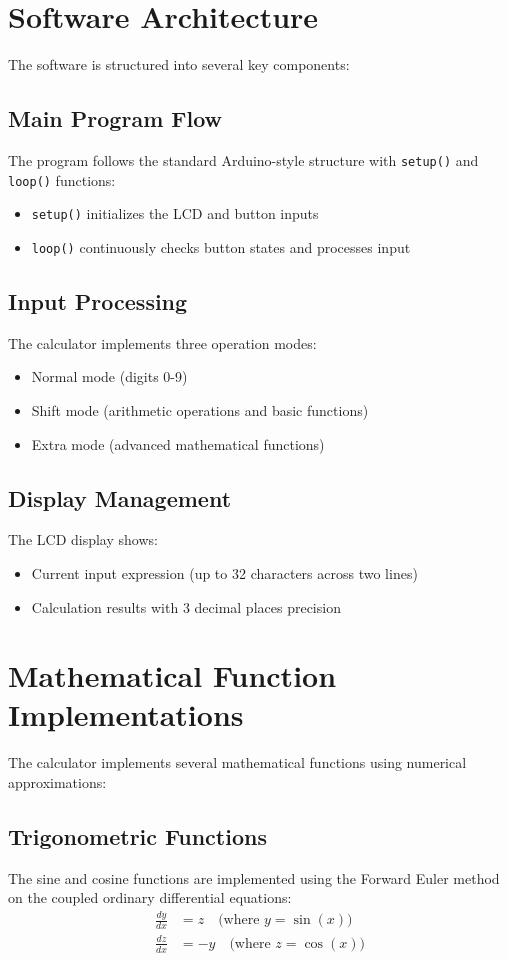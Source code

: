 \documentclass{article}
\begin{document}
\section{Software Architecture}
The software is structured into several key components:

\subsection{Main Program Flow}
The program follows the standard Arduino-style structure with \texttt{setup()} and \texttt{loop()} functions:
\begin{itemize}
    \item \texttt{setup()} initializes the LCD and button inputs
    \item \texttt{loop()} continuously checks button states and processes input
\end{itemize}

\subsection{Input Processing}
The calculator implements three operation modes:
\begin{itemize}
    \item Normal mode (digits 0-9)
    \item Shift mode (arithmetic operations and basic functions)
    \item Extra mode (advanced mathematical functions)
\end{itemize}

\subsection{Display Management}
The LCD display shows:
\begin{itemize}
    \item Current input expression (up to 32 characters across two lines)
    \item Calculation results with 3 decimal places precision
\end{itemize}

\section{Mathematical Function Implementations}
The calculator implements several mathematical functions using numerical approximations:

\subsection{Trigonometric Functions}
The sine and cosine functions are implemented using the Forward Euler method on the coupled ordinary differential equations:
\begin{align*}
    \frac{dy}{dx} &= z \quad \text{(where } y = \sin(x)\text{)} \\
    \frac{dz}{dx} &= -y \quad \text{(where } z = \cos(x)\text{)}
\end{align*}
\end{document}
